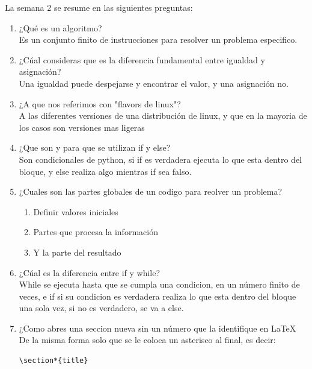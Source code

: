 \documentclass[letterpaper, 12pt, oneside]{article}%
\begin{document}
La semana 2 se resume en las siguientes preguntas:%
\begin{enumerate}%
	\item ¿Qué es un algoritmo? \\
	 Es un conjunto finito de instrucciones para resolver
	 un problema especifico.
	
	\item ¿Cúal consideras que es la diferencia fundamental entre igualdad y asignación?\\
	Una igualdad puede despejarse y encontrar el valor, y una asignación no.
	\item ¿A que nos referimos con "flavors de linux"?\\
	A las diferentes versiones de una distribución de linux, y que en la mayoria de los casos son versiones mas ligeras
	
	\item ¿Que son y para que se utilizan if y else?\\
	Son condicionales de python, si if es verdadera ejecuta lo que esta dentro del bloque, y else realiza algo mientras if sea falso.
	\item ¿Cuales son las partes globales de un codigo para reolver un problema?
		\begin{enumerate}
			\item Definir valores iniciales
			\item Partes que procesa la información
			\item Y la parte del resultado
		\end{enumerate}
	
	\item ¿Cúal es la diferencia entre if y while?\\
	While se ejecuta hasta que se cumpla una condicion, en un número finito de veces, e if si su condicion es verdadera realiza lo que esta dentro del bloque una sola vez, si no es verdadero, se va a else.
	
	\item ¿Como abres una seccion nueva sin un número que la identifique en \LaTeX\\
	De la misma forma solo que se le coloca un asterisco al final, es decir: \begin{lstlisting}
\section*{title}
	\end{lstlisting}
	

\end{enumerate}
\end{document}

